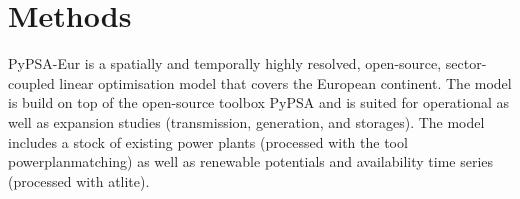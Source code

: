 \documentclass[fleqn,10pt]{wlscirep}
\let\autocite\cite
\providecommand{\DIFaddbegin}{} %
\providecommand{\DIFaddend}{} %
\begin{document}
\section*{Methods}
\DIFaddbegin {}
\DIFaddend PyPSA-Eur is a spatially and temporally highly resolved, open-source, sector-coupled linear optimisation model that covers the European continent.\autocite{horschPyPSAEurOpenOptimisation2018} The model is build on top of the open-source toolbox PyPSA \autocite{brownPyPSAPythonPower2018} and is suited for operational as well as expansion studies (transmission, generation, and storages). The model includes a stock of existing power plants (processed with the tool powerplanmatching\autocite{gotzensPerformingEnergyModelling2019}) as well as renewable potentials and availability time series (processed with atlite\autocite{hofmannAtliteLightweightPython2021}).
\end{document}
